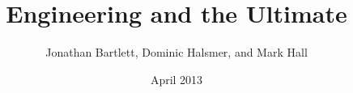 \documentclass{book}
\begin{document}
\title{Engineering and the Ultimate}
\author{Jonathan Bartlett, Dominic Halsmer, and Mark Hall}
\date{April 2013}
\maketitle

\tableofcontents






















\cleardoublepage
{}
\printindex
\end{document}
